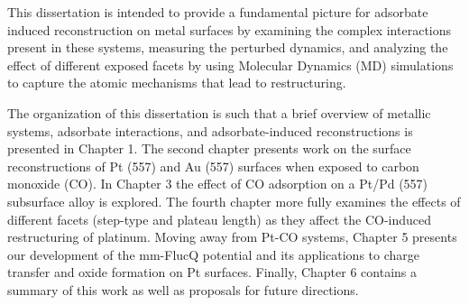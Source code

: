 This dissertation is intended to provide a fundamental picture for adsorbate
induced reconstruction on metal surfaces by examining the complex interactions
present in these systems, measuring the perturbed dynamics, and analyzing the
effect of different exposed facets by using Molecular Dynamics (MD) simulations
to capture the atomic mechanisms that lead to restructuring.



The organization of this dissertation is such that a brief overview of metallic
systems, adsorbate interactions, and adsorbate-induced reconstructions is
presented in Chapter 1.  The second chapter presents work on the surface
reconstructions of Pt (557) and Au (557) surfaces when exposed to carbon
monoxide (CO). In Chapter 3 the effect of CO adsorption on a Pt/Pd (557)
subsurface alloy is explored. The fourth chapter more fully examines the
effects of different facets (step-type and plateau length) as they affect the
CO-induced restructuring of platinum. Moving away from Pt-CO systems, Chapter 5
presents our development of the mm-FlucQ potential and its applications to
charge transfer and oxide formation on Pt surfaces. Finally, Chapter 6 contains
a summary of this work as well as proposals for future directions.

